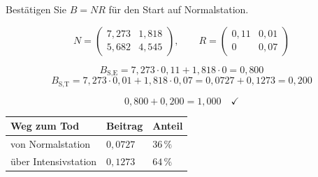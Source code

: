 \begin{aufgabe}
Bestätigen Sie $B = NR$ für den Start auf Normalstation.

\loesung
{}
\[ N = \begin{pmatrix} 7{,}273 & 1{,}818\\ 5{,}682 & 4{,}545\end{pmatrix}, \qquad R = \begin{pmatrix} 0{,}11 & 0{,}01\\ 0 & 0{,}07\end{pmatrix} \]

\[ B_{\text{S,E}} = 7{,}273\cdot0{,}11 + 1{,}818\cdot0 = 0{,}800 \]
\[ B_{\text{S,T}} = 7{,}273\cdot0{,}01 + 1{,}818\cdot0{,}07 = 0{,}0727+0{,}1273 = 0{,}200 \]

\[ 0{,}800 + 0{,}200 = 1{,}000 \quad \checkmark \]

\begin{center}
{\small
\renewcommand{\arraystretch}{1.48}
\begin{tabular}{@{}P{3.2cm}P{2.4cm}P{2.2cm}@{}}
\toprule
\textbf{Weg zum Tod} & \textbf{Beitrag} & \textbf{Anteil}\\
\midrule
von Normalstation & $0{,}0727$ & $36\,\%$\\
über Intensivstation & $0{,}1273$ & $64\,\%$\\
\bottomrule
\end{tabular}}
\end{center}

\begin{center}
\begin{minipage}{0.88\textwidth}
\end{minipage}
\end{center}
\end{aufgabe}

